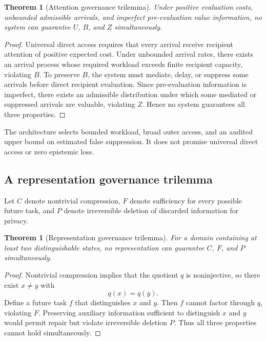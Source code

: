 \documentclass[11pt]{article}
\newtheorem{theorem}[definition]{Theorem}
\theoremstyle{definition}
\begin{document}
\begin{theorem}[Attention governance trilemma]
Under positive evaluation costs, unbounded admissible arrivals, and imperfect pre-evaluation value information, no system can guarantee \(U\), \(B\), and \(Z\) simultaneously.
\end{theorem}

\begin{proof}
Universal direct access requires that every arrival receive recipient attention of positive expected cost. Under unbounded arrival rates, there exists an arrival process whose required workload exceeds finite recipient capacity, violating \(B\). To preserve \(B\), the system must mediate, delay, or suppress some arrivals before direct recipient evaluation. Since pre-evaluation information is imperfect, there exists an admissible distribution under which some mediated or suppressed arrivals are valuable, violating \(Z\). Hence no system guarantees all three properties.
\end{proof}

The architecture selects bounded workload, broad outer access, and an audited upper bound on estimated false suppression. It does not promise universal direct access or zero epistemic loss.

\subsection{A representation governance trilemma}

Let \(C\) denote nontrivial compression, \(F\) denote sufficiency for every possible future task, and \(P\) denote irreversible deletion of discarded information for privacy.

\begin{theorem}[Representation governance trilemma]
For a domain containing at least two distinguishable states, no representation can guarantee \(C\), \(F\), and \(P\) simultaneously.
\end{theorem}

\begin{proof}
Nontrivial compression implies that the quotient \(q\) is noninjective, so there exist \(x\neq y\) with
\[
q(x)=q(y).
\]
Define a future task \(f\) that distinguishes \(x\) and \(y\). Then \(f\) cannot factor through \(q\), violating \(F\). Preserving auxiliary information sufficient to distinguish \(x\) and \(y\) would permit repair but violate irreversible deletion \(P\). Thus all three properties cannot hold simultaneously.
\end{proof}
\end{document}
